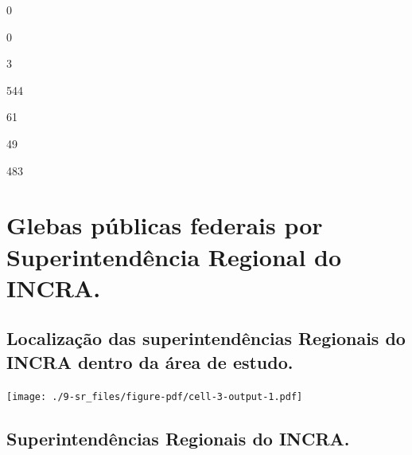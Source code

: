 \documentclass[
  letterpaper,
]{report}
\begin{document}
\n      

0

\n      

0

\n      

3

\n    

\n    

\n      

544

\n      

61

\n      

49

\n      

483

\n    

\n  

\n


\hypertarget{glebas-puxfablicas-federais-por-superintenduxeancia-regional-do-incra.}{%
\chapter{Glebas públicas federais por Superintendência Regional do
INCRA.}\label{glebas-puxfablicas-federais-por-superintenduxeancia-regional-do-incra.}}

\hypertarget{localizauxe7uxe3o-das-superintenduxeancias-regionais-do-incra-dentro-da-uxe1rea-de-estudo.}{%
\section{Localização das superintendências Regionais do INCRA dentro da
área de
estudo.}\label{localizauxe7uxe3o-das-superintenduxeancias-regionais-do-incra-dentro-da-uxe1rea-de-estudo.}}

\texttt{[image: ./9-sr\_files/figure-pdf/cell-3-output-1.pdf]}

\hypertarget{superintenduxeancias-regionais-do-incra.}{%
\section{Superintendências Regionais do
INCRA.}\label{superintenduxeancias-regionais-do-incra.}}
\end{document}
